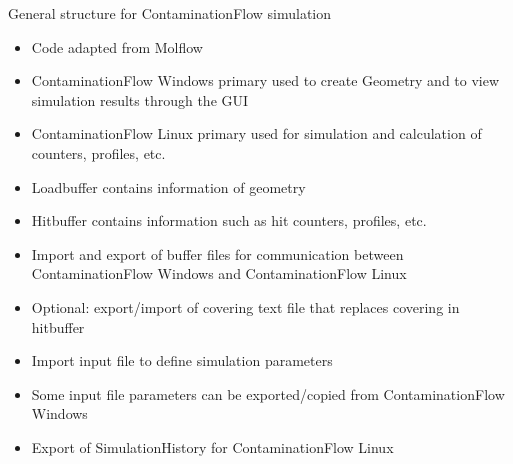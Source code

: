 \begin{center}
\end{center}
\vspace{1cm}
General structure for ContaminationFlow simulation
\begin{itemize}[noitemsep,topsep=2pt]
\item Code adapted from Molflow
\item ContaminationFlow Windows primary used to create Geometry and to view simulation results through the GUI
\item ContaminationFlow Linux primary used for simulation and calculation of counters, profiles, etc.
\item Loadbuffer contains information of geometry
\item Hitbuffer contains information such as hit counters, profiles, etc.
\item Import and export of buffer files for communication between ContaminationFlow Windows and ContaminationFlow Linux
\item Optional: export/import of covering text file that replaces covering in hitbuffer
\item Import input file to define simulation parameters
\item Some input file parameters can be exported/copied from ContaminationFlow Windows
\item Export of SimulationHistory for ContaminationFlow Linux
\end{itemize}